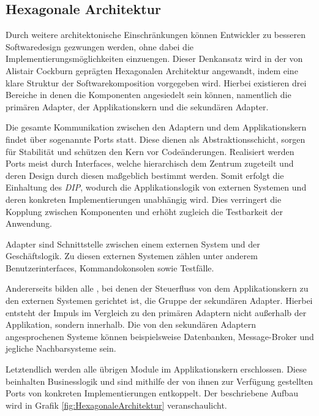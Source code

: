 \subsection{Hexagonale Architektur}

Durch weitere architektonische Einschränkungen können Entwickler zu besseren Softwaredesign gezwungen werden, ohne dabei die Implementierungsmöglichkeiten einzuengen. Dieser Denkansatz wird in der von Alistair Cockburn geprägten Hexagonalen Architektur angewandt, indem eine klare Struktur der Softwarekomposition vorgegeben wird. Hierbei existieren drei Bereiche in denen die Komponenten angesiedelt sein können, namentlich die primären Adapter, der Applikationskern und die sekundären Adapter. 

Die gesamte Kommunikation zwischen den Adaptern und dem Applikationskern findet über sogenannte Ports statt. Diese dienen als Abstraktionsschicht, sorgen für Stabilität und schützen den Kern vor Codeänderungen. Realisiert werden Ports meist durch Interfaces, welche hierarchisch dem Zentrum zugeteilt und deren Design durch diesen maßgeblich bestimmt werden. Somit erfolgt die Einhaltung des \emph{\acrlong{DIP}}, wodurch die Applikationslogik von externen Systemen und deren konkreten Implementierungen unabhängig wird. Dies verringert die Kopplung zwischen Komponenten und erhöht zugleich die Testbarkeit der Anwendung.

Adapter sind Schnittstelle zwischen einem externen System und der Geschäftslogik.  Zu diesen externen Systemen zählen unter anderem Benutzerinterfaces, Kommandokonsolen sowie Testfälle. 

Andererseits bilden alle , bei denen der Steuerfluss von dem Applikationskern zu den externen Systemen gerichtet ist, die Gruppe der sekundären Adapter. Hierbei entsteht der Impuls im Vergleich zu den primären Adaptern nicht außerhalb der Applikation, sondern innerhalb. Die von den sekundären Adaptern angesprochenen Systeme können beispielsweise Datenbanken, Message-Broker und jegliche Nachbarsysteme sein. 

Letztendlich werden alle übrigen Module im Applikationskern erschlossen. Diese beinhalten Businesslogik und sind mithilfe der von ihnen zur Verfügung gestellten Ports von konkreten Implementierungen entkoppelt. Der beschriebene Aufbau wird in Grafik \ref{fig:HexagonaleArchitektur} veranschaulicht.


